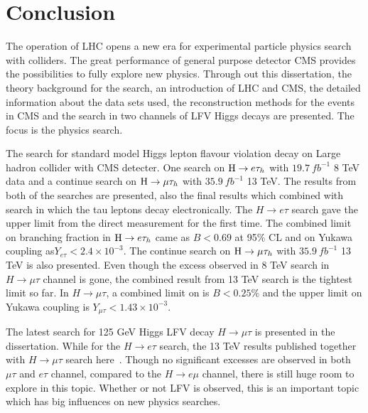 %
%
%
%
%
%
%
%
%
%

%
%

\chapter{Conclusion}

The operation of LHC opens a new era for experimental particle physics search with colliders. The great performance of general purpose detector CMS provides the possibilities to fully explore new physics. Through out this dissertation, the theory background for the search, an introduction of LHC and CMS, the detailed information about the data sets used, the reconstruction methods for the events in CMS and the search in two channels of LFV Higgs decays are presented. The focus is the physics search. 

  
The search for standard model Higgs lepton flavour violation decay on Large hadron collider with CMS detecter. One search on $\mathrm{H} \to e \tau_{h}$ with $19.7~fb^{-1}$ 8 TeV data and a continue search on $\mathrm{H}\to \mu\tau_{h}$ with $35.9~fb^{-1}$ 13 TeV. The results from both of the searches are presented, also the final results which combined with search in which the tau leptons decay electronically. The $H \to e \tau$ search gave the upper limit from the direct measurement for the first time. The combined limit on branching fraction in $\mathrm{H} \to e \tau_{h}$ came as $B<0.69$ at 95\% CL and on Yukawa coupling as$Y_{e\tau}<2.4\times10^{-3}$. The continue search on $\mathrm{H}\to \mu\tau_{h}$ with $35.9~fb^{-1}$ 13 TeV is also presented. Even though the excess observed in 8 TeV search in $H \to \mu \tau$ channel is gone, the combined result from 13 TeV search is the tightest limit so far. In $H \to \mu \tau$, a combined limit on  is $B<0.25\%$ and the upper limit on Yukawa coupling is $Y_{\mu\tau}<1.43\times10^{-3}$.   

The latest search for 125 GeV Higgs LFV decay $H \to \mu \tau$ is presented in the dissertation. While for the $H \to e \tau$ search, the 13 TeV results published together with $H \to \mu \tau$ search here~\cite{Sirunyan2018}. Though no significant excesses are observed in both $\mu\tau$ and $e\tau$ channel, compared to the $H \to e \mu$ channel, there is still huge room to explore in this topic. Whether or not LFV is observed, this is an important topic which has big influences on new physics searches.  









